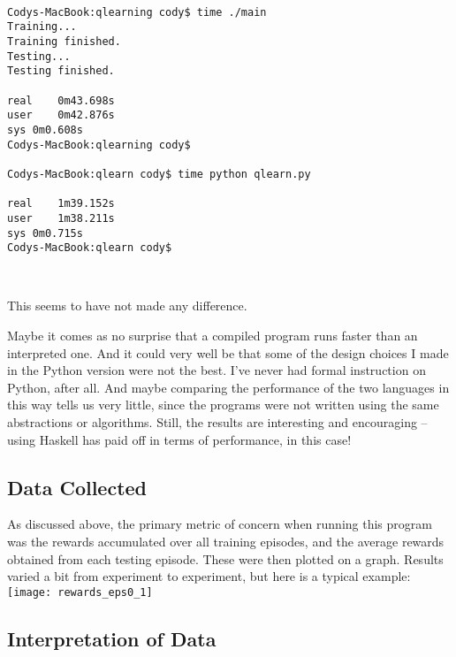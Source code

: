 \documentclass[12pt,a4paper]{article}
\begin{document}
			\begin{lstlisting}[numbers=none]

Codys-MacBook:qlearning cody$ time ./main
Training...
Training finished.
Testing...
Testing finished.

real	0m43.698s
user	0m42.876s
sys	0m0.608s
Codys-MacBook:qlearning cody$

Codys-MacBook:qlearn cody$ time python qlearn.py

real	1m39.152s
user	1m38.211s
sys	0m0.715s
Codys-MacBook:qlearn cody$
					\end{lstlisting}\ \\
					
					\par This seems to have not made any difference. 
					\par Maybe it comes as no surprise that a compiled program runs faster than an interpreted one. And it could very well be that some of the design choices I made in the Python version were not the best. I've never had formal instruction on Python, after all. And maybe comparing the performance of the two languages in this way tells us very little, since the programs were not written using the same abstractions or algorithms. Still, the results are interesting and encouraging -- using Haskell has paid off in terms of performance, in this case!

		\subsection{Data Collected}\label{data}
		
			\par As discussed above, the primary metric of concern when running this program was the rewards accumulated over all training episodes, and the average rewards obtained from each testing episode. These were then plotted on a graph. Results varied a bit from experiment to experiment, but here is a typical example:\\
			
			\texttt{[image: rewards\_eps0\_1]}
			
			
		\subsection{Interpretation of Data}\label{interp}
		
\end{document}
